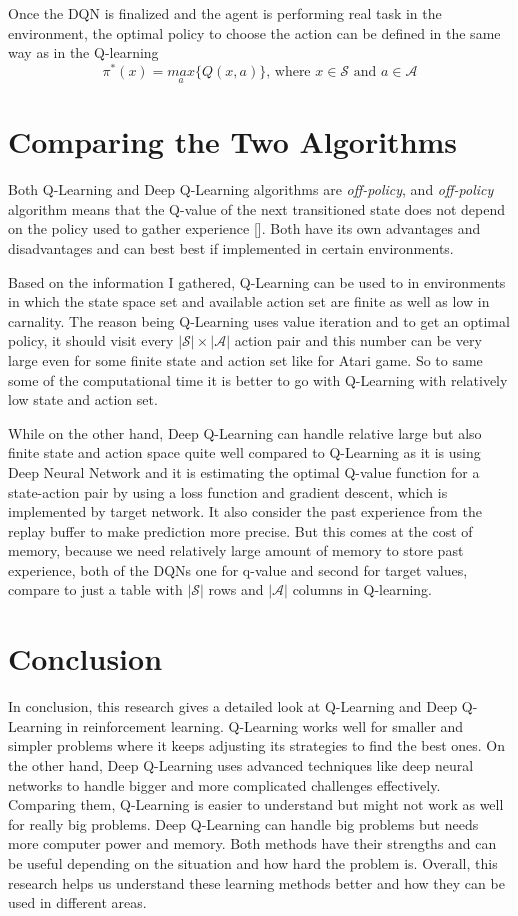 \documentclass[12pt]{article}
\begin{document}
Once the DQN is finalized and the agent is performing real task in the environment, the optimal policy to choose the action can be defined in the same way as in the Q-learning $$\pi^*(x) = \underset{a}{max}\{Q(x,a)\} \text{, where } x \in \mathcal{S} \text{ and } a \in \mathcal{A}$$

\section{Comparing the Two Algorithms}

Both Q-Learning and Deep Q-Learning algorithms are \textit{off-policy}, and \textit{off-policy} algorithm means that the Q-value of the next transitioned state does not depend on the policy used to gather experience [\cite{laura}]. Both have its own advantages and disadvantages and can best best if implemented in certain environments.

Based on the information I gathered, Q-Learning can be used to in environments in which the state space set and available action set are finite as well as low in carnality. The reason being Q-Learning uses value iteration and to get an optimal policy, it should visit every $|\mathcal{S}| \times |\mathcal{A}|$ action pair and this number can be very large even for some finite state and action set like for Atari game. So to same some of the computational time it is better to go with Q-Learning with relatively low state and action set.

While on the other hand, Deep Q-Learning can handle relative large but also finite state and action space quite well compared to Q-Learning as it is using Deep Neural Network and it is estimating the optimal Q-value function for a state-action pair by using a loss function and gradient descent, which is implemented by target network. It also consider the past experience from the replay buffer to make prediction more precise. But this comes at the cost of memory, because we need relatively large amount of memory to store past experience, both of the DQNs one for q-value and second for target values, compare to just a table with $|\mathcal{S}|$ rows and $|\mathcal{A}|$ columns in Q-learning.

\section{Conclusion}

In conclusion, this research gives a detailed look at Q-Learning and Deep Q-Learning in reinforcement learning. Q-Learning works well for smaller and simpler problems where it keeps adjusting its strategies to find the best ones. On the other hand, Deep Q-Learning uses advanced techniques like deep neural networks to handle bigger and more complicated challenges effectively. Comparing them, Q-Learning is easier to understand but might not work as well for really big problems. Deep Q-Learning can handle big problems but needs more computer power and memory. Both methods have their strengths and can be useful depending on the situation and how hard the problem is. Overall, this research helps us understand these learning methods better and how they can be used in different areas.

\newpage


\end{document}
